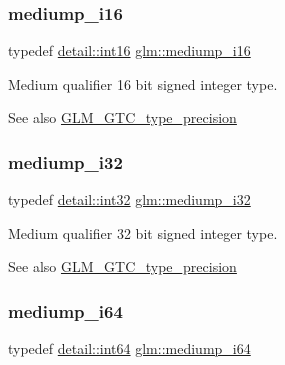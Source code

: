 \subsubsection{\texorpdfstring{mediump\+\_\+i16}{mediump\_i16}}
{\footnotesize\ttfamily typedef \hyperlink{namespaceglm_1_1detail_a375938874ca4f0a0982ec6373b56117b}{detail\+::int16} \hyperlink{group__gtc__type__precision_ga8454fc6a82c7bb787d0ac9663e08f63d}{glm\+::mediump\+\_\+i16}}

Medium qualifier 16 bit signed integer type. \begin{DoxySeeAlso}{See also}
\hyperlink{group__gtc__type__precision}{G\+L\+M\+\_\+\+G\+T\+C\+\_\+type\+\_\+precision} 
\end{DoxySeeAlso}
\mbox{\label{group__gtc__type__precision_ga5e00ec824eb55968a6b6496f294d8c07}} 
\subsubsection{\texorpdfstring{mediump\+\_\+i32}{mediump\_i32}}
{\footnotesize\ttfamily typedef \hyperlink{namespaceglm_1_1detail_a9f85b4efeca416cdcec2fd08939a2e17}{detail\+::int32} \hyperlink{group__gtc__type__precision_ga5e00ec824eb55968a6b6496f294d8c07}{glm\+::mediump\+\_\+i32}}

Medium qualifier 32 bit signed integer type. \begin{DoxySeeAlso}{See also}
\hyperlink{group__gtc__type__precision}{G\+L\+M\+\_\+\+G\+T\+C\+\_\+type\+\_\+precision} 
\end{DoxySeeAlso}
\mbox{\label{group__gtc__type__precision_ga90fedf6c701ffbe00535156715e50787}} 
\subsubsection{\texorpdfstring{mediump\+\_\+i64}{mediump\_i64}}
{\footnotesize\ttfamily typedef \hyperlink{namespaceglm_1_1detail_a5b1c3227ec636c24a0676746381adfc8}{detail\+::int64} \hyperlink{group__gtc__type__precision_ga90fedf6c701ffbe00535156715e50787}{glm\+::mediump\+\_\+i64}}

